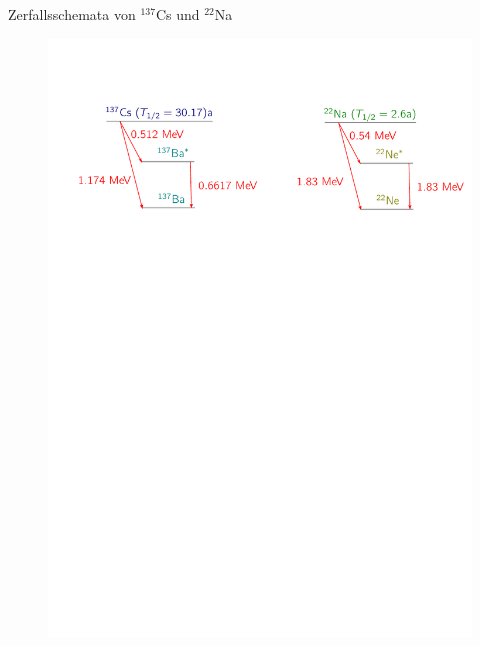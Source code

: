 \documentclass[xcolor=x11names,compress]{beamer}
\renewcommand{\(}{\begin{columns}}
\renewcommand{\)}{\end{columns}}
\newcommand{\<}[1]{\begin{column}{#1}}
\renewcommand{\>}{\end{column}}
\begin{document}
\begin{frame}[t]{Zerfallsschemata von $^{137}$Cs und  $^{22}$Na}
 \begin{figure}[htpb]
    \centering
    \includegraphics[width=1.0\linewidth]{../figures/terms}
\label{fig:term_schemata}
\end{figure}
\end{frame}
\end{document}
